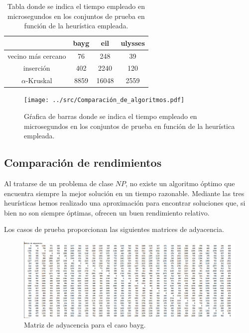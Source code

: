 \begin{table}[H]
  \centering
  \begin{tabular}{|c|c|c|c|}
    \hline
    & bayg & eil & ulysses \\
    \hline
    vecino más cercano & 76 & 248 & 39 \\
    \hline
    inserción & 402 & 2240 & 120 \\
    \hline
    $\alpha$-Kruskal & 8859 & 16048 & 2559 \\
    \hline
  \end{tabular}
  \caption{Tabla donde se indica el tiempo empleado en microsegundos en los conjuntos de prueba en función de la heurística empleada.}
\end{table}


\begin{figure}[H]
  \centering
  \texttt{[image: ../src/Comparación\_de\_algoritmos.pdf]}
  \caption{Gŕafica de barras donde se indica el tiempo empleado en microsegundos en los conjuntos de prueba en función de la heurística empleada.}
\end{figure}

\subsection{Comparación de rendimientos}

Al tratarse de un problema de clase $NP$, no existe un algoritmo óptimo que encuentra siempre
la mejor solución en un tiempo razonable. Mediante las tres heurísticas hemos realizado una aproximación
para encontrar soluciones que, si bien no son siempre óptimas, ofrecen un buen rendimiento relativo.

Los casos de prueba proporcionan las siguientes matrices de adyacencia. 

\begin{figure}[H]
  \centering
  \includegraphics[scale=0.5]{img/ady-bayg.png}
  \caption{Matriz de adyacencia para el caso bayg.}
\end{figure}

